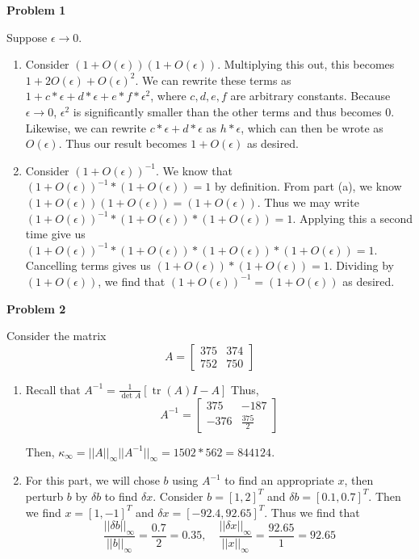 \documentclass{article}
\DeclareMathOperator{\tr}{tr}
\newcommand{\Problem}[1]{\textbf{Problem #1}}
\begin{document}
\Problem{1}

Suppose $\epsilon \to 0$.
\begin{enumerate}

\item Consider $(1 + O(\epsilon))(1 + O(\epsilon))$. 
Multiplying this out, this becomes $1 + 2O(\epsilon) + O(\epsilon)^2$.
We can rewrite these terms as $1 + c*\epsilon + d*\epsilon + e*f*\epsilon^2$, where $c,d,e,f$ are arbitrary constants.
Because $\epsilon \to 0$, $\epsilon^2$ is significantly smaller than the other terms and thus becomes 0.
Likewise, we can rewrite $c*\epsilon + d*\epsilon$ as $h*\epsilon$, which can then be wrote as $O(\epsilon)$. 
Thus our result becomes $1 + O(\epsilon)$ as desired.

\item Consider $(1 + O(\epsilon))^{-1}$. 
We know that $(1 + O(\epsilon))^{-1}*(1 + O(\epsilon)) = 1$ by definition. 
From part (a), we know $(1 + O(\epsilon))(1 + O(\epsilon)) = (1 + O(\epsilon))$. 
Thus we may write $(1 + O(\epsilon))^{-1}*(1 + O(\epsilon))*(1 + O(\epsilon)) = 1$. 
Applying this a second time give us $(1 + O(\epsilon))^{-1}*(1 + O(\epsilon))*(1 + O(\epsilon))*(1 + O(\epsilon)) = 1$. 
Cancelling terms gives us $(1 + O(\epsilon))*(1 + O(\epsilon)) = 1$.
Dividing by $(1 + O(\epsilon))$, we find that $(1 + O(\epsilon))^{-1} = (1 + O(\epsilon))$ as desired. 

\end{enumerate}

\Problem{2}

Consider the matrix
\begin{equation*}
A = \begin{bmatrix}
375 & 374\\ 
752 & 750
\end{bmatrix}
\end{equation*}
\begin{enumerate}
\item Recall that $A^{-1} = \frac{1}{\det{A}}[\tr{(A)}I -A]$	
Thus,
\begin{equation*}
A^{-1} = \begin{bmatrix}
375 & -187\\ 
-376 & \frac{375}{2}
\end{bmatrix}
\end{equation*}

Then, $\kappa_{\infty} = ||A||_{\infty}||A^{-1}||_{\infty} = 1502*562 = 844124$. 

\item For this part, we will chose $b$ using $A^{-1}$ to find an appropriate $x$, then perturb $b$ by $\delta b$ to find $\delta x$. 
Consider $b = [1,2]^T$ and $\delta b = [0.1,0.7]^T$.
Then we find $x = [1,-1]^T$ and $\delta x = [-92.4,92.65]^T$. 
Thus we find that 
\begin{equation*}
\frac{||\delta b||_{\infty}}{||b||_{\infty}} = \frac{0.7}{2} = 0.35,\quad 	\frac{||\delta x||_{\infty}}{||x||_{\infty}} = \frac{92.65}{1} = 92.65
\end{equation*}

\end{enumerate}
\end{document}
